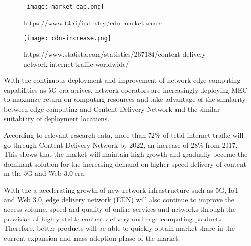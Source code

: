 \documentclass[12pt, a4paper, unicode]{report}
\begin{document}
    \begin{figure}[ht]
    \centering
    \texttt{[image: market-cap.png]}
    \caption{https://www.t4.ai/industry/cdn-market-share}
    \label{fig:cdn-market}
    \end{figure}
    
    \begin{figure}[ht]
        \centering
        \texttt{[image: cdn-increase.png]}
        \caption{https://www.statista.com/statistics/267184/content-delivery-network-internet-traffic-worldwide/}
        \label{fig:cdn-increase}
    \end{figure}
    

    With the continuous deployment and improvement of network edge computing capabilities as 5G era arrives, network operators are increasingly deploying MEC  to maximize return on computing resources and take advantage of the similarity between edge computing and Content Delivery Network and the similar suitability of deployment locations.

    According to relevant research data, more than 72\% of total internet traffic will go through Content Delivery Network by 2022, an increase of 28\% from 2017. This shows that the market will maintain high growth and gradually become the dominant solution for the increasing demand on higher speed delivery of content in the 5G and Web 3.0 era.

    With the a accelerating growth of new network infrastructure such as 5G, IoT and Web 3.0, edge delivery network (EDN) will also continue to improve the access volume, speed and quality of online services and networks through the provision of highly stable content delivery and edge computing products. Therefore, better products will be able to quickly obtain market share in the current expansion and mass adoption phase of the market.


    
%    
    
\end{document}
